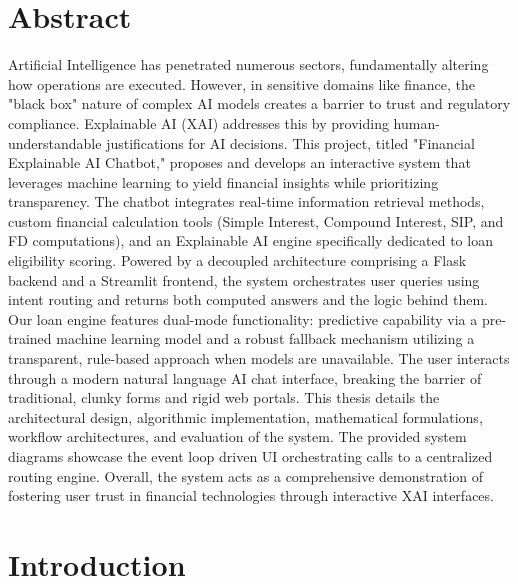 \documentclass[12pt,a4paper]{report}
\begin{document}
\chapter*{Abstract}
Artificial Intelligence has penetrated numerous sectors, fundamentally altering how operations are executed. However, in sensitive domains like finance, the "black box" nature of complex AI models creates a barrier to trust and regulatory compliance. Explainable AI (XAI) addresses this by providing human-understandable justifications for AI decisions. This project, titled "Financial Explainable AI Chatbot," proposes and develops an interactive system that leverages machine learning to yield financial insights while prioritizing transparency. The chatbot integrates real-time information retrieval methods, custom financial calculation tools (Simple Interest, Compound Interest, SIP, and FD computations), and an Explainable AI engine specifically dedicated to loan eligibility scoring. Powered by a decoupled architecture comprising a Flask backend and a Streamlit frontend, the system orchestrates user queries using intent routing and returns both computed answers and the logic behind them. Our loan engine features dual-mode functionality: predictive capability via a pre-trained machine learning model and a robust fallback mechanism utilizing a transparent, rule-based approach when models are unavailable. The user interacts through a modern natural language AI chat interface, breaking the barrier of traditional, clunky forms and rigid web portals. This thesis details the architectural design, algorithmic implementation, mathematical formulations, workflow architectures, and evaluation of the system. The provided system diagrams showcase the event loop driven UI orchestrating calls to a centralized routing engine. Overall, the system acts as a comprehensive demonstration of fostering user trust in financial technologies through interactive XAI interfaces.

\pagebreak

\tableofcontents
\pagebreak

\listoffigures
{}
\pagebreak

\listoftables
{}
\pagebreak


\chapter{Introduction}
\end{document}
